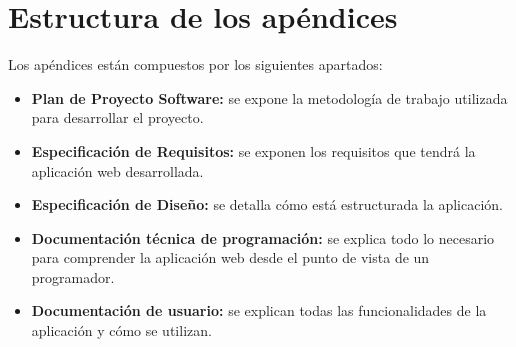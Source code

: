 \section{Estructura de los apéndices}
Los apéndices están compuestos por los siguientes apartados:
\begin{itemize}
	\item \textbf{Plan de Proyecto Software:} se expone la metodología de trabajo utilizada para desarrollar el proyecto.
	\item \textbf{Especificación de Requisitos:} se exponen los requisitos que tendrá la aplicación web desarrollada.
	\item \textbf{Especificación de Diseño:} se detalla cómo está estructurada la aplicación.
	\item \textbf{Documentación técnica de programación:} se explica todo lo necesario para comprender la aplicación web desde el punto de vista de un programador.
	\item \textbf{Documentación de usuario:} se explican todas las funcionalidades de la aplicación y cómo se utilizan.
\end{itemize}
